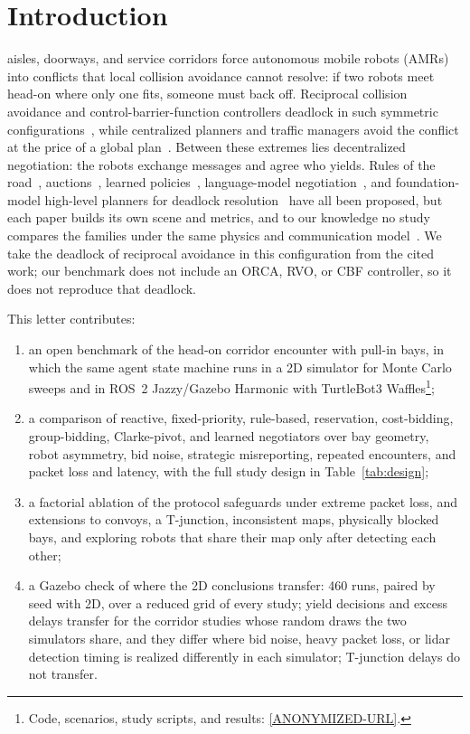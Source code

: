 \documentclass[letterpaper,journal]{IEEEtran}
\begin{document}
\section{Introduction}
 aisles, doorways, and service corridors force autonomous mobile robots (AMRs) into conflicts that local collision avoidance cannot resolve: if two robots meet head-on where only one fits, someone must back off. Reciprocal collision avoidance and control-barrier-function controllers deadlock in such symmetric configurations~\cite{grover2023before,dergachev2021distributed,chandra2025deadlock}, while centralized planners and traffic managers avoid the conflict at the price of a global plan~\cite{cap2016provably,okumura2022pibt,phillips2011sipp,hiertraffic2023,rmftraffic,openrmf}. Between these extremes lies decentralized negotiation: the robots exchange messages and agree who yields. Rules of the road~\cite{kato1992coordinating,shoham1995social}, auctions~\cite{gerkey2002sold,gautier2022negotiated}, learned policies~\cite{vmasgiveway,bettini2023heterogeneous}, language-model negotiation~\cite{marlin2024,gamechat2025}, and foundation-model high-level planners for deadlock resolution~\cite{garg2024llm} have all been proposed, but each paper builds its own scene and metrics, and to our knowledge no study compares the families under the same physics and communication model~\cite{chandra2026social}. We take the deadlock of reciprocal avoidance in this configuration from the cited work; our benchmark does not include an ORCA, RVO, or CBF controller, so it does not reproduce that deadlock.

This letter contributes:
\begin{enumerate}
\item an open benchmark of the head-on corridor encounter with pull-in bays, in which the same agent state machine runs in a 2D simulator for Monte Carlo sweeps and in ROS~2 Jazzy/Gazebo Harmonic with TurtleBot3 Waffles\footnote{Code, scenarios, study scripts, and results: \url{[ANONYMIZED-URL]}.}; %
\item a comparison of reactive, fixed-priority, rule-based, reservation, cost-bidding, group-bidding, Clarke-pivot, and learned negotiators over bay geometry, robot asymmetry, bid noise, strategic misreporting, repeated encounters, and packet loss and latency, with the full study design in Table~\ref{tab:design};
\item a factorial ablation of the protocol safeguards under extreme packet loss, and extensions to convoys, a T-junction, inconsistent maps, physically blocked bays, and exploring robots that share their map only after detecting each other;
\item a Gazebo check of where the 2D conclusions transfer: 460 runs, paired by seed with 2D, over a reduced grid of every study; yield decisions and excess delays transfer for the corridor studies whose random draws the two simulators share, and they differ where bid noise, heavy packet loss, or lidar detection timing is realized differently in each simulator; T-junction delays do not transfer.
\end{enumerate}
\end{document}
